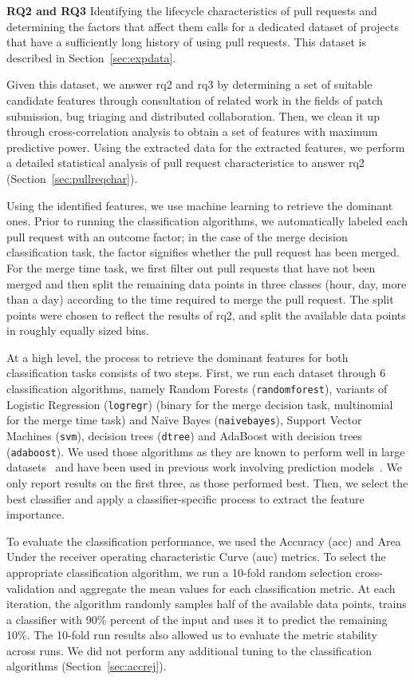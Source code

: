\documentclass{sig-alternate}
\begin{document}
{\bfseries RQ2 and RQ3}
Identifying the lifecycle characteristics of pull requests and determining the
factors that affect them calls for a dedicated dataset of projects that have a
sufficiently long history of using pull requests. This dataset is described in
Section~\ref{sec:expdata}.

Given this dataset, we answer {\sc rq2} and {\sc rq3} by determining a set of
suitable candidate features through consultation of related work in the fields
of patch submission, bug triaging and distributed collaboration. Then, we clean
it up through cross-correlation analysis to obtain a set of features with
maximum predictive power. Using the extracted data for the extracted features,
we perform a detailed statistical analysis of pull request characteristics to
answer {\sc rq2} (Section~\ref{sec:pullreqchar}).

Using the identified features, we use machine learning to retrieve the dominant
ones. Prior to running the classification algorithms, we automatically labeled
each pull request with an outcome factor; in the case of the \textsf{merge
decision} classification task, the factor signifies whether the pull request has
been merged. For the \textsf{merge time} task, we first filter out pull requests
that have not been merged and then split the remaining data points in three
classes (\textsf{hour}, \textsf{day}, \textsf{more than a day}) according to the time
required to merge the pull request. The split points were chosen to reflect the
results of {\sc rq2}, and split the available data points in roughly equally
sized bins.

At a high level, the process to retrieve the dominant features for both
classification tasks consists of two steps.  First, we run each dataset through
6 classification algorithms, namely Random Forests (\texttt{randomforest}),
variants of Logistic Regression (\texttt{logregr}) (binary for the \textsf{merge
decision} task, multinomial for the \textsf{merge time} task) and Na\"ive Bayes
(\texttt{naivebayes}), Support Vector Machines (\texttt{svm}), decision trees
(\texttt{dtree}) and AdaBoost with decision trees (\texttt{adaboost}). We used
those algorithms as they are known to perform well in large
datasets~\cite{Lessm08} and have been used in previous work involving prediction
models~\cite{Giger12}. We only report results on the first three, as those
performed best. Then, we select the best classifier and apply a
classifier-specific process to extract the feature importance. 

To evaluate the classification performance, we used the Accuracy ({\sc acc}) and
Area Under the receiver operating characteristic Curve ({\sc auc}) metrics. To
select the appropriate classification algorithm, we run a 10-fold random
selection cross-validation and aggregate the mean values for each classification
metric. At each iteration, the algorithm randomly samples half of the
available data points, trains a classifier with 90\% percent of the input and
uses it to predict the remaining 10\%. The 10-fold run results also allowed us to
evaluate the metric stability across runs. We did not perform any additional
tuning to the classification algorithms (Section~\ref{sec:accrej}).
\end{document}
